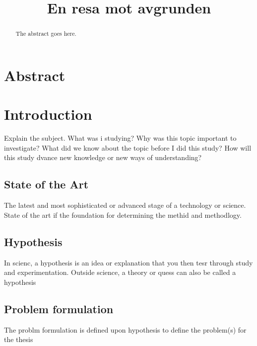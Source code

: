 \documentclass[conference]{IEEEtran}
\begin{document}
\title{En resa mot avgrunden}

\author{
\and
}

\maketitle

\begin{abstract}
The abstract goes here.
\end{abstract}

\IEEEpeerreviewmaketitle

\section{Abstract}

\section{Introduction}
Explain the subject. What was i studying? Why was this topic important to investigate? What did we know about the topic before I did this study? How will this study dvance new knowledge or new ways of understanding?
\subsection{State of the Art}
The latest and most sophisticated or advanced stage of a technology or science. State of the art if the foundation for determining the methid and methodlogy.
\subsection{Hypothesis}
In scienc, a hypothesis is an idea or explanation that you then tesr through study and experimentation. Outside science, a theory or quess can also be called a hypothesis
\subsection{Problem formulation}
The problm formulation is defined upon hypothesis to define the problem(s) for the thesis
\end{document}
